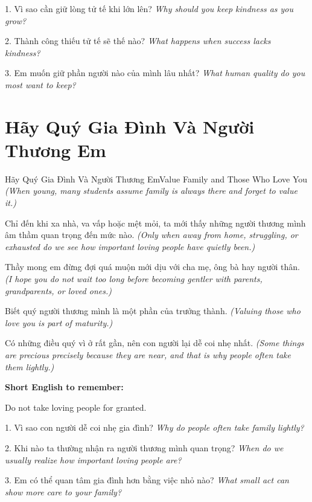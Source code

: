 \begin{tuhocnhanh}
1. Vì sao cần giữ lòng tử tế khi lớn lên? \textit{Why should you keep kindness as you grow?}

2. Thành công thiếu tử tế sẽ thế nào? \textit{What happens when success lacks kindness?}

3. Em muốn giữ phần người nào của mình lâu nhất? \textit{What human quality do you most want to keep?}
\end{tuhocnhanh}
\ngancach

\section{Hãy Quý Gia Đình Và Người Thương Em}
\begin{truyen}{Hãy Quý Gia Đình Và Người Thương Em}{Value Family and Those Who Love You}
\textit{(When young, many students assume family is always there and forget to value it.)}

Chỉ đến khi xa nhà, va vấp hoặc mệt mỏi, ta mới thấy những người thương mình âm thầm quan trọng đến mức nào.
\textit{(Only when away from home, struggling, or exhausted do we see how important loving people have quietly been.)}

Thầy mong em đừng đợi quá muộn mới dịu với cha mẹ, ông bà hay người thân.
\textit{(I hope you do not wait too long before becoming gentler with parents, grandparents, or loved ones.)}

Biết quý người thương mình là một phần của trưởng thành.
\textit{(Valuing those who love you is part of maturity.)}
\end{truyen}

\begin{baihoc}
Có những điều quý vì ở rất gần, nên con người lại dễ coi nhẹ nhất.
\textit{(Some things are precious precisely because they are near, and that is why people often take them lightly.)}
\end{baihoc}

\begin{ghinhoanh}
\textbf{Short English to remember:}

Do not take loving people for granted.

\end{ghinhoanh}

\begin{tuhocnhanh}
1. Vì sao con người dễ coi nhẹ gia đình? \textit{Why do people often take family lightly?}

2. Khi nào ta thường nhận ra người thương mình quan trọng? \textit{When do we usually realize how important loving people are?}

3. Em có thể quan tâm gia đình hơn bằng việc nhỏ nào? \textit{What small act can show more care to your family?}
\end{tuhocnhanh}
\ngancach

